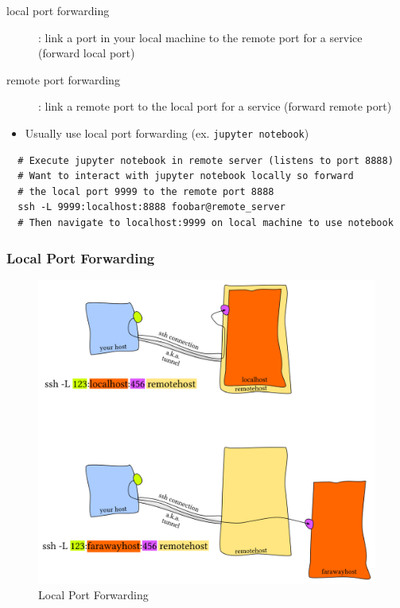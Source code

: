 \documentclass[letterpaper,12pt]{article}
\begin{document}
\begin{description}
 \item[local port forwarding]: link a port in your local machine to the remote port for a service (forward local port)
 \item[remote port forwarding]: link a remote port to the local port for a service (forward remote port)
\end{description}

\begin{itemize}
 \item Usually use local port forwarding (ex. \lstinline{jupyter notebook})
\end{itemize}

\begin{lstlisting}
  # Execute jupyter notebook in remote server (listens to port 8888)
  # Want to interact with jupyter notebook locally so forward
  # the local port 9999 to the remote port 8888
  ssh -L 9999:localhost:8888 foobar@remote_server
  # Then navigate to localhost:9999 on local machine to use notebook
\end{lstlisting}

\subsubsection{Local Port Forwarding}

\begin{figure}[H]
 \includegraphics[width=160mm, scale=0.75]{pictures/local-port-forwarding.png}
 \caption{Local Port Forwarding}
\end{figure}
\end{document}
